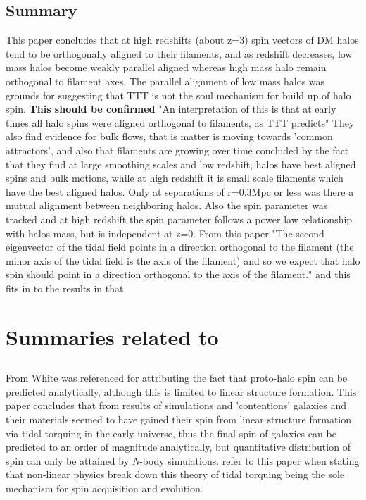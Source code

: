 \documentclass[fleqn,usenatbib]{mnras}
\begin{document}
\subsection{Summary}
This paper concludes that at high redshifts (about z=3) spin vectors of DM halos tend to be orthogonally aligned to their filaments, and as redshift decreases, low mass halos become weakly parallel aligned whereas high mass halo remain orthogonal to filament axes. The parallel alignment of low mass halos was grounds for suggesting that TTT is not the soul mechanism for build up of halo spin.
\textbf{This should be confirmed} "An interpretation of this is that at early times all halo
spins were aligned orthogonal to filaments, as TTT predicts"
They also find evidence for bulk flows, that is matter is moving towards 'common attractors', and also that filaments are growing over time concluded by the fact that they find at large smoothing scales and low redshift, halos have best aligned spins and bulk motions, while at high redshift it is small scale filaments which have the best aligned halos.
Only at separations of r=0.3Mpc or less was there a mutual alignment between neighboring halos. Also the spin parameter was tracked and at high redshift the spin parameter follows a power law relationship with halos mass, but is independent at z=0. 
From this paper "The second eigenvector of the tidal field points in a direction orthogonal to the filament (the minor axis of the tidal field is the axis of the filament) and so we expect that halo spin should point in a direction orthogonal to the axis of the filament." and this fits in to the results in that

\section{Summaries related to \citet{Trowland_13}}
\subsection{\citet{White84}}
From \citet{Trowland_13} White was referenced for attributing the fact that proto-halo spin can be predicted analytically, although this is limited to linear structure formation.
This paper concludes that from results of simulations and 'contentions' galaxies and their materials seemed to have gained their spin from linear structure formation via tidal torquing in the early universe, thus the final spin of galaxies can be predicted to an order of magnitude analytically, but quantitative distribution of spin can only be attained by \textit{N}-body simulations. \citet{Bett_Frenk_12} refer to this paper when stating that non-linear physics break down this theory of tidal torquing being the sole mechanism for spin acquisition and evolution.
\end{document}
